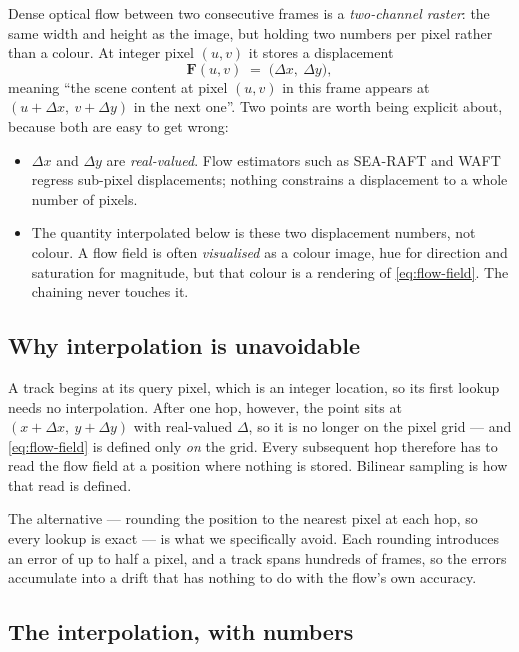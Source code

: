 \documentclass[11pt,a4paper]{article}
\begin{document}
Dense optical flow between two consecutive frames is a \emph{two-channel raster}:
the same width and height as the image, but holding two numbers per pixel rather
than a colour. At integer pixel $(u,v)$ it stores a displacement
\begin{equation}\label{eq:flow-field}
  \bm{F}(u,v) \;=\; \bigl(\Delta x,\ \Delta y\bigr),
\end{equation}
meaning ``the scene content at pixel $(u,v)$ in this frame appears at
$(u+\Delta x,\ v+\Delta y)$ in the next one''. Two points are worth being explicit
about, because both are easy to get wrong:
\begin{itemize}
  \item $\Delta x$ and $\Delta y$ are \emph{real-valued}. Flow estimators such as
        SEA-RAFT and WAFT regress sub-pixel displacements; nothing constrains a
        displacement to a whole number of pixels.
  \item The quantity interpolated below is these two displacement numbers, not
        colour. A flow field is often \emph{visualised} as a colour image, hue for
        direction and saturation for magnitude, but that colour is a rendering of
        \eqref{eq:flow-field}. The chaining never touches it.
\end{itemize}

\subsection{Why interpolation is unavoidable}

A track begins at its query pixel, which is an integer location, so its first
lookup needs no interpolation. After one hop, however, the point sits at
$(x+\Delta x,\ y+\Delta y)$ with real-valued $\Delta$, so it is no longer on the
pixel grid --- and \eqref{eq:flow-field} is defined only \emph{on} the grid. Every
subsequent hop therefore has to read the flow field at a position where nothing is
stored. Bilinear sampling is how that read is defined.

The alternative --- rounding the position to the nearest pixel at each hop, so
every lookup is exact --- is what we specifically avoid. Each rounding introduces
an error of up to half a pixel, and a track spans hundreds of frames, so the
errors accumulate into a drift that has nothing to do with the flow's own
accuracy.

\subsection{The interpolation, with numbers}
\end{document}
